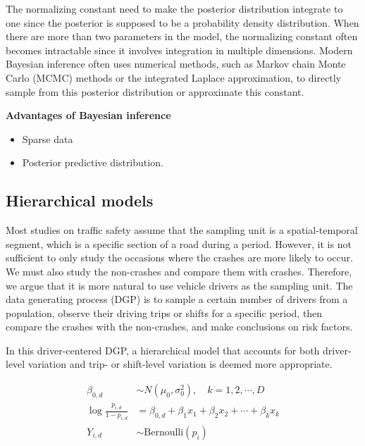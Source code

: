 \documentclass[12pt]{book}
\numberwithin{equation}{chapter}
\providecommand{\tightlist}{%
  \setlength{\itemsep}{0pt}\setlength{\parskip}{0pt}}
\begin{document}
The normalizing constant need to make the posterior distribution integrate to one since the posterior is supposed to be a probability density distribution. When there are more than two parameters in the model, the normalizing constant often becomes intractable since it involves integration in multiple dimensions. Modern Bayesian inference often uses numerical methods, such as Markov chain Monte Carlo (MCMC) methods or the integrated Laplace approximation, to directly sample from this posterior distribution or approximate this constant.

\textbf{Advantages of Bayesian inference}

\begin{itemize}
\tightlist
\item
  Sparse data
\item
  Posterior predictive distribution.
\end{itemize}

\hypertarget{hierarchical-models}{%
\subsection{Hierarchical models}\label{hierarchical-models}}

Most studies on traffic safety assume that the sampling unit is a spatial-temporal segment, which is a specific section of a road during a period. However, it is not sufficient to only study the occasions where the crashes are more likely to occur. We must also study the non-crashes and compare them with crashes. Therefore, we argue that it is more natural to use vehicle drivers as the sampling unit. The data generating process (DGP) is to sample a certain number of drivers from a population, observe their driving trips or shifts for a specific period, then compare the crashes with the non-crashes, and make conclusions on risk factors.

In this driver-centered DGP, a hierarchical model that accounts for both driver-level variation and trip- or shift-level variation is deemed more appropriate.

\begin{equation}
\begin{split}
\beta_{0, d} &\sim N(\mu_0, \sigma_0^2), \quad k = 1, 2, \cdots, D\\
\log\frac{p_{i, d}}{1-p_{i, d}} &= \beta_{0, d} + \beta_1x_1 + \beta_2x_2 + \cdots + \beta_kx_k\\
Y_{i, d} &\sim \text{Bernoulli}(p_i)
\label{eq:hierarchicalbayes}
\end{split}
\end{equation}
\end{document}

